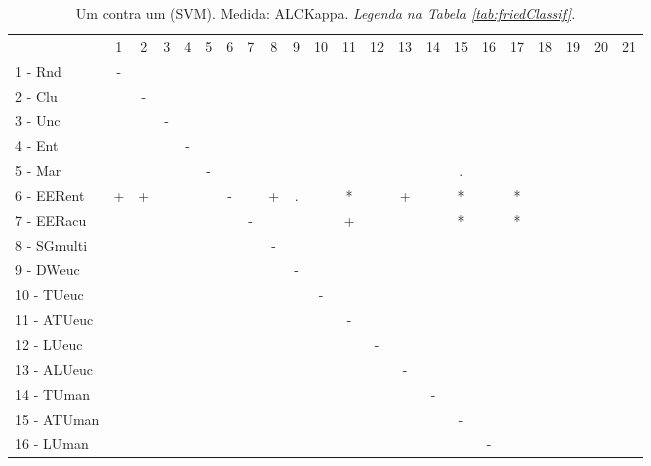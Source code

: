 \begin{table}[h]
\caption{Um contra um (SVM). Medida: ALCKappa. \textit{Legenda na Tabela \ref{tab:friedClassif}.}}
\begin{center}\begin{tabular}{lcc|cc|cc|cc|cc|cc|cc|cc|cc|cc|c}
 			& 1 & 2 & 3 & 4 & 5 & 6 & 7 & 8 & 9 & 10 & 11 & 12 & 13 & 14 & 15 & 16 & 17 & 18 & 19 & 20 & 21\\
1 - Rnd  	& - &   &   &   &   &   &   &   &   &   &   &   &   &   &   &   &   &   &   &   &   \\
2 - Clu  	&   & - &   &   &   &   &   &   &   &   &   &   &   &   &   &   &   &   &   &   &   \\ \hline
3 - Unc  	&   &   & - &   &   &   &   &   &   &   &   &   &   &   &   &   &   &   &   &   &   \\
4 - Ent  	&   &   &   & - &   &   &   &   &   &   &   &   &   &   &   &   &   &   &   &   &   \\ \hline
5 - Mar  	&   &   &   &   & - &   &   &   &   &   &   &   &   &   & . &   &   &   &   &   &   \\
6 - EERent	& + & + &   &   &   & - &   & + & . &   & * &   & + &   & * &   & * &   &   &   &   \\ \hline
7 - EERacu	&   &   &   &   &   &   & - &   &   &   & + &   &   &   & * &   & * &   &   &   &   \\
8 - SGmulti	&   &   &   &   &   &   &   & - &   &   &   &   &   &   &   &   &   &   &   &   &   \\ \hline
9 - DWeuc	&   &   &   &   &   &   &   &   & - &   &   &   &   &   &   &   &   &   &   &   &   \\
10 - TUeuc	&   &   &   &   &   &   &   &   &   & - &   &   &   &   &   &   &   &   &   &   &   \\ \hline
11 - ATUeuc	&   &   &   &   &   &   &   &   &   &   & - &   &   &   &   &   &   &   &   &   &   \\
12 - LUeuc	&   &   &   &   &   &   &   &   &   &   &   & - &   &   &   &   &   &   &   &   &   \\ \hline
13 - ALUeuc	&   &   &   &   &   &   &   &   &   &   &   &   & - &   &   &   &   &   &   &   &   \\
14 - TUman	&   &   &   &   &   &   &   &   &   &   &   &   &   & - &   &   &   &   &   &   &   \\ \hline
15 - ATUman	&   &   &   &   &   &   &   &   &   &   &   &   &   &   & - &   &   &   &   &   &   \\
16 - LUman	&   &   &   &   &   &   &   &   &   &   &   &   &   &   &   & - &   &   &   &   &   \\ \hline

\end{tabular}
\end{center}
\end{table}
